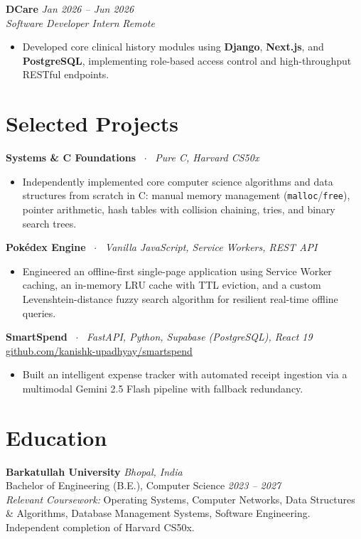 \documentclass[10pt,a4paper]{article}
\begin{document}
\textbf{DCare} \hfill \textit{Jan 2026 -- Jun 2026} \\
\textit{Software Developer Intern} \hfill \textit{Remote}
\begin{itemize}
    \item Developed core clinical history modules using \textbf{Django}, \textbf{Next.js}, and \textbf{PostgreSQL}, implementing role-based access control and high-throughput RESTful endpoints.
\end{itemize}

\section{Selected Projects}
\textbf{Systems \& C Foundations} \ $\cdot$ \ \textit{Pure C, Harvard CS50x}
\begin{itemize}
    \item Independently implemented core computer science algorithms and data structures from scratch in C: manual memory management (\texttt{malloc}/\texttt{free}), pointer arithmetic, hash tables with collision chaining, tries, and binary search trees.
\end{itemize}

\textbf{Pokédex Engine} \ $\cdot$ \ \textit{Vanilla JavaScript, Service Workers, REST API}
\begin{itemize}
    \item Engineered an offline-first single-page application using Service Worker caching, an in-memory LRU cache with TTL eviction, and a custom Levenshtein-distance fuzzy search algorithm for resilient real-time offline queries.
\end{itemize}

\textbf{SmartSpend} \ $\cdot$ \ \textit{FastAPI, Python, Supabase (PostgreSQL), React 19} \hfill \href{https://github.com/kanishk-upadhyay/smartspend}{github.com/kanishk-upadhyay/smartspend}
\begin{itemize}
    \item Built an intelligent expense tracker with automated receipt ingestion via a multimodal Gemini 2.5 Flash pipeline with fallback redundancy.
\end{itemize}

\section{Education}
\textbf{Barkatullah University} \hfill \textit{Bhopal, India} \\
Bachelor of Engineering (B.E.), Computer Science \hfill \textit{2023 -- 2027} \\
\textit{Relevant Coursework:} Operating Systems, Computer Networks, Data Structures \& Algorithms, Database Management Systems, Software Engineering. Independent completion of Harvard CS50x.
\end{document}
